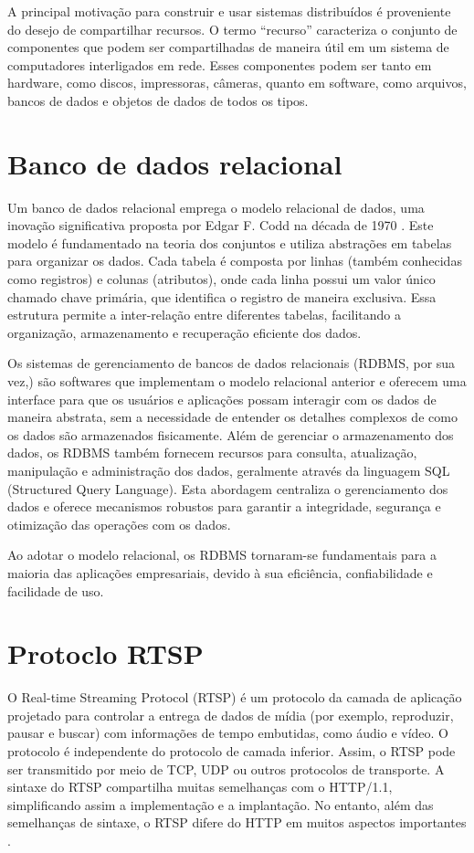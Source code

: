\documentclass[12pt, %
openright, 
oneside, %
a4paper,    %
brazil]{facom-ufu-abntex2}
\begin{document}
A principal motivação para construir e usar sistemas distribuídos é proveniente
do desejo de compartilhar recursos. O termo “recurso” caracteriza o conjunto de
componentes que podem ser compartilhadas de maneira útil em um sistema de
computadores interligados em rede. Esses componentes podem ser tanto em
hardware, como discos, impressoras, câmeras, quanto em software, como arquivos,
bancos de dados e objetos de dados de todos os tipos.

\section{Banco de dados relacional}

Um banco de dados relacional emprega o modelo relacional de dados, uma inovação
significativa proposta por Edgar F. Codd na década de 1970
\cite{10.1145/362384.362685}. Este modelo é fundamentado na teoria dos
conjuntos e utiliza abstrações em tabelas para organizar os dados. Cada tabela
é composta por linhas (também conhecidas como registros) e colunas (atributos),
onde cada linha possui um valor único chamado chave primária, que identifica o
registro de maneira exclusiva. Essa estrutura permite a inter-relação entre
diferentes tabelas, facilitando a organização, armazenamento e recuperação
eficiente dos dados.

Os sistemas de gerenciamento de bancos de dados relacionais (RDBMS, por sua
vez,) são softwares que implementam o modelo relacional anterior e oferecem uma
interface para que os usuários e aplicações possam interagir com os dados de
maneira abstrata, sem a necessidade de entender os detalhes complexos de como
os dados são armazenados fisicamente. Além de gerenciar o armazenamento dos
dados, os RDBMS também fornecem recursos para consulta, atualização,
manipulação e administração dos dados, geralmente através da linguagem SQL
(Structured Query Language). Esta abordagem centraliza o gerenciamento dos
dados e oferece mecanismos robustos para garantir a integridade, segurança e
otimização das operações com os dados.

Ao adotar o modelo relacional, os RDBMS tornaram-se fundamentais para a maioria
das aplicações empresariais, devido à sua eficiência, confiabilidade e
facilidade de uso.

\section{Protoclo RTSP}

O Real-time Streaming Protocol (RTSP) é um protocolo da camada de aplicação
projetado para controlar a entrega de dados de mídia (por exemplo, reproduzir,
pausar e buscar) com informações de tempo embutidas, como áudio e vídeo. O
protocolo é independente do protocolo de camada inferior. Assim, o RTSP pode
ser transmitido por meio de TCP, UDP ou outros protocolos de transporte. A
sintaxe do RTSP compartilha muitas semelhanças com o HTTP/1.1, simplificando
assim a implementação e a implantação. No entanto, além das semelhanças de
sintaxe, o RTSP difere do HTTP em muitos aspectos importantes \cite{rfc2326}.
\end{document}
